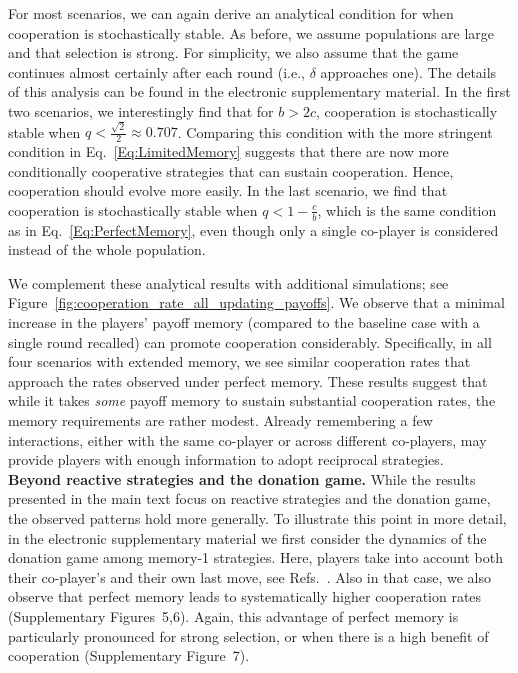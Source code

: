 \documentclass[11pt]{article}
\def\esm{electronic supplementary material}
\newcommand{\FigHigherMemory}{Figure~\ref{fig:cooperation_rate_all_updating_payoffs}}
\newcommand{\FigMemoryOneParameters}{Supplementary Figure~7}
\theoremstyle{plainCl1}
\theoremstyle{plainCl2}
\begin{document}

For most scenarios, we can again derive an analytical condition for when cooperation is stochastically stable. 
As before, we assume populations are large and that selection is strong. 
For simplicity, we also assume that the game continues almost certainly after each round (i.e., $\delta$ approaches one). 
The details of this analysis can be found in the \esm. 
In the first two scenarios, we interestingly find that for $b\!>\!2c$, cooperation is stochastically stable when $q\!<\! \frac{\sqrt{2}}{2}\approx 0.707$. 
Comparing this condition with the more stringent condition in Eq.~\eqref{Eq:LimitedMemory} suggests that there are now more conditionally cooperative strategies that can sustain cooperation. 
Hence, cooperation should evolve more easily.
In the last scenario, we find that cooperation is stochastically stable when \(q
< 1 - \frac{c}{b}\), which is the same condition as in
Eq.~\eqref{Eq:PerfectMemory}, even though only a single co-player is considered
instead of the whole population. 


We complement these analytical results with additional simulations; see \FigHigherMemory.
We observe that a minimal increase in the players' payoff memory (compared to the baseline case with a single round recalled) can promote cooperation considerably. 
Specifically, in all four scenarios with extended memory, we see similar cooperation rates that approach the rates observed under perfect memory. 
These results suggest that while it takes {\it some} payoff memory to sustain substantial cooperation rates, the memory requirements are rather modest. 
Already remembering a few interactions, either with the same co-player or across different co-players, may provide players with enough information to adopt reciprocal strategies.\\




\noindent
{\bf Beyond reactive strategies and the donation game.} 
While the results presented in the main text focus on reactive strategies and the donation game, the observed patterns hold more generally.
To illustrate this point in more detail, in the \esm{} we first consider the dynamics of the donation game among memory-1 strategies. 
Here, players take into account both their co-player's and their own last move, see Refs.~\citep{nowak:Nature:1993,imhof:JTB:2007}. 
Also in that case, we also observe that perfect memory leads to systematically higher cooperation rates (Supplementary Figures~5,6).
Again, this advantage of perfect memory is particularly pronounced for strong selection, or when there is a high benefit of cooperation (\FigMemoryOneParameters).
\end{document}
